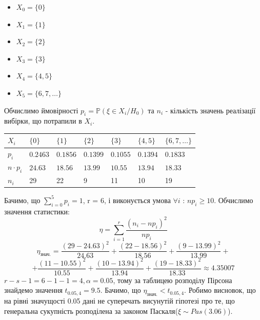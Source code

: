 \documentclass{article}
\begin{document}
\begin{multicols}{2}
  \begin{itemize}
    \item $X_0 = \{0\}$
    \item $X_1 = \{1\}$
    \item $X_2 = \{2\}$
    \item $X_3 = \{3\}$
    \item $X_4 = \{4, 5\}$
    \item $X_5 = \{6, 7, \dots\}$
  \end{itemize}
\end{multicols}
\newpage
Обчислимо ймовірності $p_i = \mathbb{P}(\xi \in X_i/H_0)$ та 
$n_i$ - кількість значень реалізації вибірки, що потрапили в 
$X_i$.
\newline
\begin{tabular}{|l|l|l|l|l|l|l|}
  \hline
  $X_i$ & $\{0\}$ & $\{1\}$ & $\{2\}$ & $\{3\}$ & $\{4, 5\}$ & 
  $\{6, 7, \dots\}$ \\
  \hline
  $p_i$ & $0.2463$ & $0.1856$ & $0.1399$ & $0.1055$ & 
  $0.1394$ & $0.1833$\\
  \hline
  $n\cdot p_i$ & $24.63$ & $18.56$ & $13.99$ & $10.55$ & 
  $13.94$ & $18.33$\\
  \hline
  $n_i$ & 29 & 22 & 9 & 11 & 10 & 19 \\
  \hline
\end{tabular}
\newline
\newline
Бачимо, що $\sum_{i = 0}^{5}p_i = 1$, r = 6, і виконується умова 
\newline
$\forall i$ : 
$np_i \geq 10$.
Обчислимо значення статистики:
$$\eta = \sum_{i=1}^r\frac{(n_i - np_i)^2}{np_i}$$
$$\eta_\text{знач.} = \frac{(29 - 24.63)^2}{24.63} + 
\frac{(22 - 18.56)^2}{18.56} + \frac{(9 - 13.99)^2}{13.99} + $$
$$+ \frac{(11 - 10.55)^2}{10.55} + \frac{(10 - 13.94)^2}{13.94} + 
\frac{(19 - 18.33)^2}{18.33} \approx 4.35007$$
$r - s - 1 = 6 - 1 - 1 = 4, \alpha = 0.05$, тому за таблицею розподілу 
Пірсона знайдемо значення $t_{0.05, 4} = 9.5$. Бачимо, що 
$\eta_\text{знач.} < t_{0.05, 4}$. Робимо висновок, що на рівні 
значущості 0.05 дані не суперечать висунутій гіпотезі про те, що 
генеральна сукупність розподілена за законом Паскаля($\xi 
\sim Pas(3.06)$).
\newpage
\end{document}

